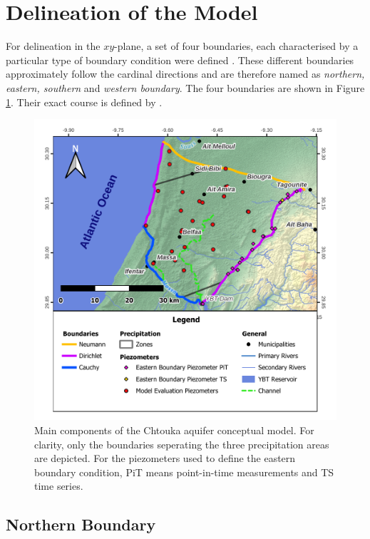 
\section{Delineation of the Model}
\label{Sec-Delineation}

For delineation in the $xy$-plane, a set of four boundaries, each characterised by a particular type of boundary condition were defined \parencite{Anzar.2016}. 
These different boundaries approximately follow the cardinal directions and are therefore named as \textit{northern, eastern, southern} and \textit{western boundary}. 
The four boundaries are shown in Figure \ref{Map-BCPzPrec}. 
Their exact course is defined by \textcite{Anzar.2016}.

\begin{figure}[p]
    \centering
    \includegraphics{./img/Map-BCPzPrec.pdf}
    \caption{Main components of the Chtouka aquifer conceptual model. For clarity, only the boundaries seperating the three precipitation areas are depicted. For the piezometers used to define the eastern boundary condition, PiT means point-in-time measurements and TS time series.}
    \label{Map-BCPzPrec}
\end{figure}

\subsection{Northern Boundary}

